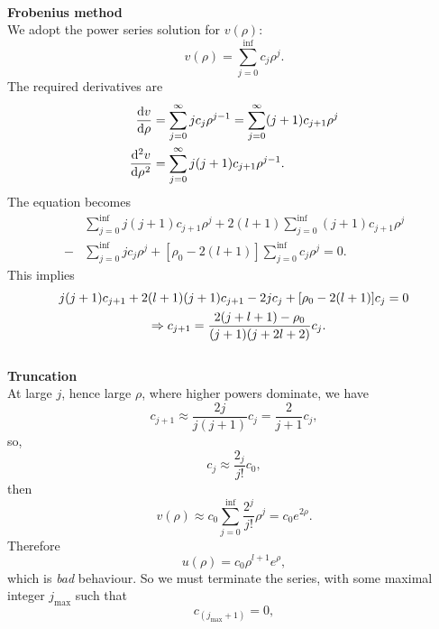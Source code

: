 \ \\
\textbf{Frobenius method}\\
We adopt the power series solution for $v(\rho)$:
\begin{equation}
v(\rho)=\sum^{\inf}_{j=0}c_j\rho^j. 
\end{equation}
The required derivatives are 
\begin{subequations}
\begin{align}
\diff v\rho&=\sum^{\inf}_{j=0} jc_j\rho^{j-1}=\sum^{\inf}_{j=0} (j+1)c_{j+1}\rho^j\\
\diff[2]v\rho&=\sum^{\inf}_{j=0} j(j+1)c_{j+1}\rho^{j-1}.
\end{align}
\end{subequations}
The equation becomes 
\begin{equation}
\begin{split}
&\sum^{\inf}_{j=0} j(j+1)c_{j+1}\rho^j+2(l+1)\sum^{\inf}_{j=0} (j+1)c_{j+1}\rho^j\\
-&\sum^{\inf}_{j=0} jc_j\rho^j+[\rho_0-2(l+1)]\sum^{\inf}_{j=0} c_j\rho^j=0.
\end{split}
\end{equation}
This implies 
\begin{equation}
\begin{aligned}
j(j+1)c_{j+1}+2&(l+1)(j+1)c_{j+1}-2jc_j+[\rho_0-2(l+1)]c_j=0\\
&\Rightarrow c_{j+1}=\frac{2(j+l+1)-\rho_0}{(j+1)(j+2l+2)} c_j. 
\end{aligned}
\end{equation}
\ \\
\textbf{Truncation}\\
At large $j$, hence large $\rho$, where higher powers dominate, we have
\begin{equation}
c_{j+1}\approx\frac{2j}{j(j+1)}c_j=\frac{2}{j+1}c_j, 
\end{equation}
so, 
\begin{equation}
c_j\approx\frac{2_j}{j!}c_0, 
\end{equation}
then
\begin{equation}
v(\rho)\approx c_0 \sum^{\inf}_{j=0} \frac{2^j}{j!}\rho^j=c_0e^{2\rho}.
\end{equation}
Therefore
\begin{equation}
u(\rho)=c_0\rho^{l+1}e^{\rho}, 
\end{equation}
which is \textit{bad} behaviour. So we must terminate the series, with some 
maximal integer $j_{\text{max}}$ such that
\begin{equation}
c_{(j_{\text{max}}+1)}=0, 
\end{equation}
